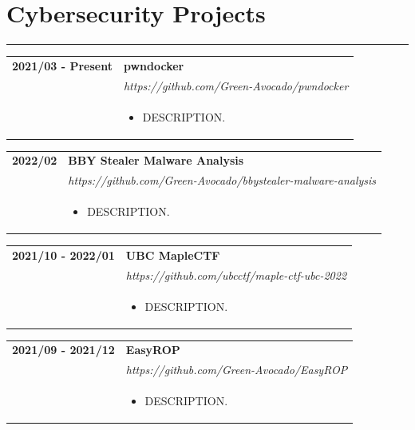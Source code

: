 \documentclass[letterpaper]{article}
\newcommand{\sect}[1]{\section*{#1}
                        {\color{cyan}
                        \rule{\textwidth}{1pt}
                        \vspace{-1ex}}}
\begin{document}
    \sect{Cybersecurity Projects}

        \begin{tabular}{p{} p{}}
            \textbf{2021/03 - Present} & \textbf{pwndocker} \\
            & \emph{https://github.com/Green-Avocado/pwndocker} \\
            & \begin{itemize}
                \item DESCRIPTION.
            \end{itemize}
            \\
        \end{tabular}

        \begin{tabular}{p{} p{}}
            \textbf{2022/02} & \textbf{BBY Stealer Malware Analysis} \\
            & \emph{https://github.com/Green-Avocado/bbystealer-malware-analysis} \\
            & \begin{itemize}
                \item DESCRIPTION.
            \end{itemize}
            \\
        \end{tabular}

        \begin{tabular}{p{} p{}}
            \textbf{2021/10 - 2022/01} & \textbf{UBC MapleCTF} \\
            & \emph{https://github.com/ubcctf/maple-ctf-ubc-2022} \\
            & \begin{itemize}
                \item DESCRIPTION.
            \end{itemize}
            \\
        \end{tabular}

        \begin{tabular}{p{} p{}}
            \textbf{2021/09 - 2021/12} & \textbf{EasyROP} \\
            & \emph{https://github.com/Green-Avocado/EasyROP} \\
            & \begin{itemize}
                \item DESCRIPTION.
            \end{itemize}
            \\
        \end{tabular}
\end{document}
